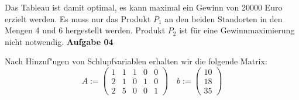 \documentclass[a4paper,10pt]{article}
\begin{document}
	Das Tableau ist damit optimal, es kann maximal ein Gewinn von 20000 Euro erzielt werden. Es muss nur das Produkt $P_1$ an den beiden Standorten in den Mengen 4 und 6 hergestellt werden. Produkt $P_2$ ist für eine Gewinnmaximierung nicht notwendig.
	\newpage
	\textbf{Aufgabe 04}
	\begin{compactenum} [(a)]
		\item 
		Nach Hinzuf"ugen von Schlupfvariablen erhalten wir die folgende Matrix:\\
		\[
		A:=
		\begin{pmatrix}
		1 & 1 & 1 & 0 & 0\\
		2 & 1 & 0 & 1 & 0\\
		2 & 5 & 0 & 0 & 1
		\end{pmatrix} \quad b:= 
		\begin{pmatrix}
		10\\
		18\\
		35
		\end{pmatrix}
		\]
		\ \\
\end{compactenum}
\end{document}
